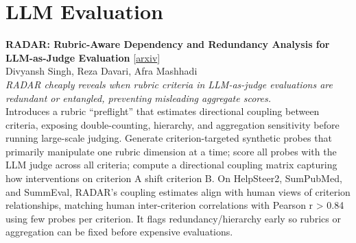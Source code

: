 \documentclass[12pt,letterpaper]{article}
\begin{document}
\medskip


\section*{LLM Evaluation}

{\small\textbf{RADAR: Rubric-Aware Dependency and Redundancy Analysis for LLM-as-Judge Evaluation}} {\scriptsize[\href{https://arxiv.org/abs/2608.01810}{arxiv}]}\\
{\scriptsize Divyansh Singh, Reza Davari, Afra Mashhadi}\\

{\small\textit{RADAR cheaply reveals when rubric criteria in LLM-as-judge evaluations are redundant or entangled, preventing misleading aggregate scores.}}\\[1pt]
{\footnotesize Introduces a rubric ``preflight'' that estimates directional coupling between criteria, exposing double-counting, hierarchy, and aggregation sensitivity before running large-scale judging. Generate criterion-targeted synthetic probes that primarily manipulate one rubric dimension at a time; score all probes with the LLM judge across all criteria; compute a directional coupling matrix capturing how interventions on criterion A shift criterion B. On HelpSteer2, SumPubMed, and SummEval, RADAR's coupling estimates align with human views of criterion relationships, matching human inter-criterion correlations with Pearson r > 0.84 using few probes per criterion. It flags redundancy/hierarchy early so rubrics or aggregation can be fixed before expensive evaluations.}

\medskip
\end{document}
